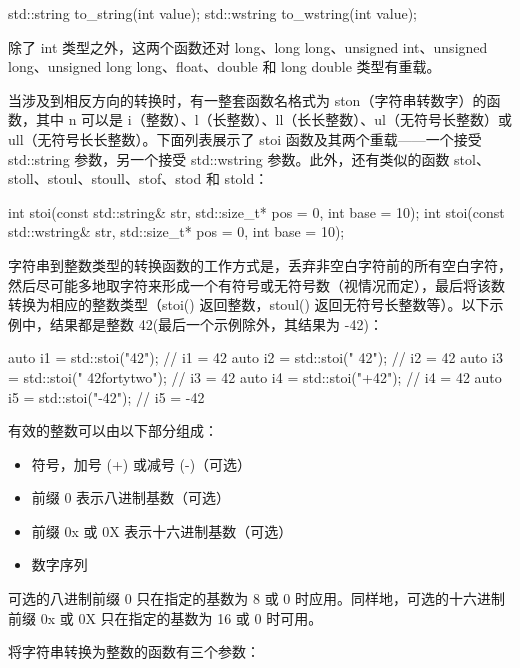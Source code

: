 \begin{cpp}
std::string to_string(int value);
std::wstring to_wstring(int value);
\end{cpp}

除了 int 类型之外，这两个函数还对 long、long long、unsigned int、unsigned long、unsigned long long、float、double 和 long double 类型有重载。

当涉及到相反方向的转换时，有一整套函数名格式为 ston（字符串转数字）的函数，其中 n 可以是 i（整数）、l（长整数）、ll（长长整数）、ul（无符号长整数）或 ull（无符号长长整数）。下面列表展示了 stoi 函数及其两个重载——一个接受 std::string 参数，另一个接受 std::wstring 参数。此外，还有类似的函数 stol、stoll、stoul、stoull、stof、stod 和 stold：

\begin{cpp}
int stoi(const std::string& str, std::size_t* pos = 0, int base = 10);
int stoi(const std::wstring& str, std::size_t* pos = 0, int base = 10);
\end{cpp}

字符串到整数类型的转换函数的工作方式是，丢弃非空白字符前的所有空白字符，然后尽可能多地取字符来形成一个有符号或无符号数（视情况而定），最后将该数转换为相应的整数类型（stoi() 返回整数，stoul() 返回无符号长整数等）。以下示例中，结果都是整数 42(最后一个示例除外，其结果为 -42)：

\begin{cpp}
auto i1 = std::stoi("42");             // i1 = 42
auto i2 = std::stoi("   42");          // i2 = 42
auto i3 = std::stoi("   42fortytwo");  // i3 = 42
auto i4 = std::stoi("+42");            // i4 = 42
auto i5 = std::stoi("-42");            // i5 = -42
\end{cpp}

有效的整数可以由以下部分组成：

\begin{itemize}
\item
符号，加号 (+) 或减号 (-)（可选）

\item
前缀 0 表示八进制基数（可选）

\item
前缀 0x 或 0X 表示十六进制基数（可选）

\item
数字序列
\end{itemize}

可选的八进制前缀 0 只在指定的基数为 8 或 0 时应用。同样地，可选的十六进制前缀 0x 或 0X 只在指定的基数为 16 或 0 时可用。

将字符串转换为整数的函数有三个参数：

